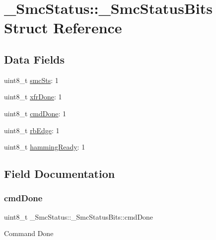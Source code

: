 \hypertarget{struct__SmcStatus_1_1__SmcStatusBits}{}\section{\+\_\+\+Smc\+Status\+::\+\_\+\+Smc\+Status\+Bits Struct Reference}
\label{struct__SmcStatus_1_1__SmcStatusBits}
\subsection*{Data Fields}
\begin{DoxyCompactItemize}
\item 
uint8\+\_\+t \mbox{\hyperlink{struct__SmcStatus_1_1__SmcStatusBits_a5abc395e090868859cc63c88b9533371}{smc\+Sts}}\+: 1
\item 
uint8\+\_\+t \mbox{\hyperlink{struct__SmcStatus_1_1__SmcStatusBits_ae2117ed2167d3cf7524a539629b17ebb}{xfr\+Done}}\+: 1
\item 
uint8\+\_\+t \mbox{\hyperlink{struct__SmcStatus_1_1__SmcStatusBits_a13ce1dee209993dd05e0a4a5f2d43554}{cmd\+Done}}\+: 1
\item 
uint8\+\_\+t \mbox{\hyperlink{struct__SmcStatus_1_1__SmcStatusBits_a61b71b2c13211ce8fd0d17a2be77760f}{rb\+Edge}}\+: 1
\item 
uint8\+\_\+t \mbox{\hyperlink{struct__SmcStatus_1_1__SmcStatusBits_ab99fe37cd8208b3e6c576ea063ed2e1c}{hamming\+Ready}}\+: 1
\end{DoxyCompactItemize}


\subsection{Field Documentation}
\mbox{\label{struct__SmcStatus_1_1__SmcStatusBits_a13ce1dee209993dd05e0a4a5f2d43554}} 
\subsubsection{\texorpdfstring{cmdDone}{cmdDone}}
{\footnotesize\ttfamily uint8\+\_\+t \+\_\+\+Smc\+Status\+::\+\_\+\+Smc\+Status\+Bits\+::cmd\+Done}

Command Done \mbox{\label{struct__SmcStatus_1_1__SmcStatusBits_ab99fe37cd8208b3e6c576ea063ed2e1c}} 
